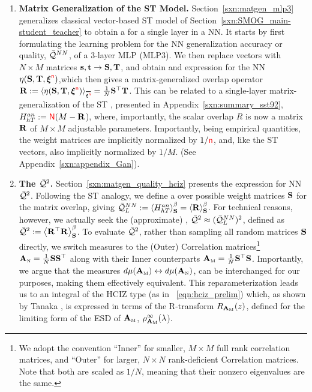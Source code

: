 
\begin{enumerate}[label=5.\arabic*]
\item
\textbf{Matrix Generalization of the ST Model.}
Section~\ref{sxn:matgen_mlp3} generalizes
classical \STATMECH vector-based ST model of Section~\ref{sxn:SMOG_main-student_teacher}
to obtain a \LayerQuality for a single layer in a NN.
It starts by first formulating the learning problem for
the NN generalization accuracy or quality, $\bar{\mathcal{Q}}^{NN}$,
of a 3-layer MLP (MLP3).
We then replace vectors with $N \times M$ matrices ${\mathbf{s}},{\mathbf{t}}\rightarrow{\mathbf{S}},{\mathbf{T}}$,
and obtain and expression for the NN \SelfOverlap $\eta({\mathbf{S}},{\mathbf{T}},\boldsymbol{\xi}^{{\color{red}\sf{n}}})$,which then gives a matrix-generalized overlap operator
$\OVERLAP:=\langle\ETA(\SMAT,\TMAT,\NDXI)\rangle_{\AVGNDXI}=\tfrac{1}{N}\SMAT^{\top}\TMAT$.
This can be related to a single-layer matrix-generalization of the ST \AnnealedHamiltonian, 
presented in Appendix~\ref{sxn:summary_sst92},
$H^{an}_{hT}:={\color{red}\sf{N}}(M-\mathbf{R}$),
where, importantly, the scalar overlap $R$ is now a matrix $\mathbf{R}$ of $M\times M$ adjustable parameters.
Importantly, being empirical quantities, the weight matrices are implicitly normalized by $1/{\color{red}\sf{n}}$, and, like the ST vectors, also implicitly normalized by $1/M$. (See Appendix~\ref{sxn:appendix_Gan}).

\item
\textbf{The \LayerQualitySquared $\bar{\mathcal{Q}}^{2}$.}
Section~\ref{sxn:matgen_quality_hciz} presents the expression for NN \LayerQualitySquared $\bar{\mathcal{Q}}^{2}$.
Following the ST analogy, we define a \ThermalAverage over possible \Student weight matrices ${\mathbf{S}}$
for the matrix overlap, giving $\bar{\mathcal{Q}}^{NN}_{L}:=\left\langle H^{an}_{hT} \right\rangle_{\mathbf S}^{\beta} =\left\langle \mathbf{R} \right\rangle_{\mathbf S}^{\beta}$.
For technical reasons, however, we actually seek the (approximate)  \LayerQualitySquared, $\bar{\mathcal{Q}}^{2}\approx (\bar{\mathcal{Q}}^{NN}_{L})^2$,
defined as $\bar{\mathcal{Q}}^{2}:=\left\langle {\mathbf{R}}^{\top}\mathbf{R} \right\rangle_{\mathbf S}^{\beta}$.
To evaluate $\bar{\mathcal{Q}}^{2}$, rather than sampling all random \Student matrices ${\mathbf{S}}$ directly,
we switch measures to the (Outer) \Student Correlation matrices\footnote{
We adopt the convention ``Inner'' for smaller, $M\times M$ full rank \Student correlation matrices, and ``Outer'' for larger, $N\times N$ rank-deficient \Student Correlation matrices.
Note that both are scaled as $1 / N$, meaning that their nonzero eigenvalues are the same.
} 
${\mathbf{A}}_{\text{\tiny N}} = \tfrac{1}{N}{\mathbf{S}}{\mathbf{S}}^{\top}$ along with their Inner counterparts
${\mathbf{A}}_{\text{\tiny M}} = \tfrac{1}{N}{\mathbf{S}}^{\top}{\mathbf{S}}$.
Importantly, we argue that the measures $d\mu({\mathbf{A}}_{\text{\tiny M}})\leftrightarrow d\mu({\mathbf{A}}_{\text{\tiny N}})$,
can be interchanged for our purposes, making them effectively equivalent.
This reparameterization leads us to an integral of the HCIZ type (as in \EQN~\ref{eqn:hciz_prelim})
which, as shown by Tanaka \cite{Tanaka2007, Tanaka2008}, is expressed in terms of the R-transform $R_{{\mathbf{A}}_{\text{\tiny M}}}(z)$, defined for the limiting form of the ESD of ${\mathbf{A}}_{\text{\tiny M}}$,  $\rho^{\infty}_{{\mathbf{A}}_{\text{\tiny M}}}(\lambda$).


\end{enumerate}

